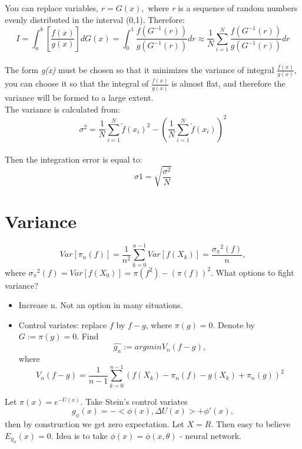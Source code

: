\documentclass{article}
\begin{document}
You can replace variables, ${r=G(x),}$ where \textit{r} is a sequence of random numbers evenly distributed in the interval (0,1). Therefore:
\newline
    \begin{equation}\label{eq:fourierrow}
        I=\int_{a}^{b}[\frac{f(x)}{g(x)}]dG(x)=\int_{0}^{1}\frac{f(G^{-1}(r))}{g(G^{-1}(r))}dr \approx \frac{1}{N}\sum_{i=1}^{N}\frac{f(G^{-1}(r))}{g(G^{-1}(r))}dr
    \end{equation}\\

The form \textit{g(x)} must be chosen so that it minimizes the variance of integral ${\frac{f(x)}{g(x)}}$, you can choose it so that the integral of ${\frac{f(x)}{g(x)}}$ is almost flat, and therefore the variance will be formed to a large extent.\\

The variance is calculated from:
\newline
    \begin{equation}\label{eq:fourierrow}
        \sigma^2=\frac{1}{N}\sum_{i=1}^{N}\widetilde{f}(x_{i})^2-(\frac{1}{N}\sum_{i=1}^{N}\widetilde{f}(x_{i}))^2
    \end{equation}\\

Then the integration error is equal to:
\newline
    \begin{equation}\label{eq:fourierrow}
        \sigma1=\sqrt{\frac{\sigma^2}{N}}
    \end{equation}
\newline

\section{Variance}
\begin{equation}
	Var[\pi_{n}(f)]=\frac{1}{n^2}\sum_{k=0}^{n-1}Var[f(X_{k})]=\frac{{\sigma_{\pi}}^2(f)}{n},
\end{equation}
where ${{\sigma_{\pi}}^2(f)}= Var[f(X_{0})]= \pi(f^2)-(\pi(f))^2$. What options to fight variance?
\begin{itemize}
	\item Increase n. Not an option in many situations.
	\item Control variates: replace ${f}$ by ${f-g}$, where ${\pi(g) = 0}$. Denote by ${G:=\pi(g)= 0}$. Find
	\begin{equation}
		\hat{g_{n}}:=argmin V_{n}(f-g),
	\end{equation}
	where
	\begin{equation}
		V_{n}(f-g)=\frac{1}{n-1}\sum_{k=0}^{n-1}(f(X_{k})-\pi_{n}(f)-g(X_{k})+\pi_{n}(g))^2
	\end{equation}
\end{itemize}
Let ${\pi(x)=e^{-U(x)}}$. Take Stein's control variates
\begin{equation}
	g_{\phi}(x)=-<\phi(x),\Delta U(x)>+\phi'(x),
\end{equation}
then by construction we get zero expectation.
Let ${X=R}$. Then easy to believe ${E_{g_{\phi}}(x)=0}$. Idea is to take ${\phi(x)=\phi(x,\theta)}$ - neural network.
\end{document}
